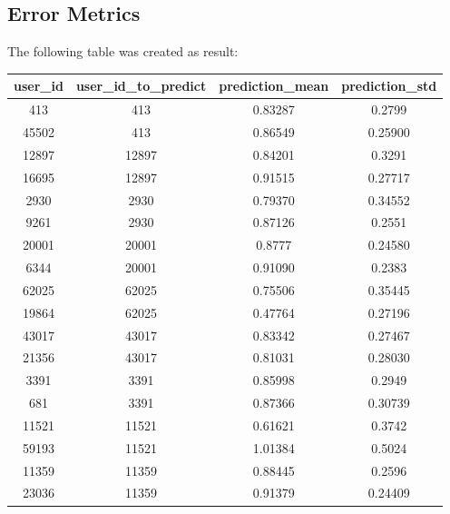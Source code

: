 \documentclass[ecp,tc,english]{iiufrgs}
\begin{document}
        \subsection{Error Metrics}
        The following table was created as result:
        \begin{table}[!ht]
            \centering
            \begin{tabular}{ |c|c|c|c| } 
                \hline
                user\_id & user\_id\_to\_predict & prediction\_mean & prediction\_std \\
                \hline 
                413 & 413 & 0.83287 & 0.2799 \\
                45502 & 413 & 0.86549 & 0.25900 \\
                \rowcolor[RGB]{220,220,220}
                12897 & 12897 & 0.84201 & 0.3291 \\
                \rowcolor[RGB]{220,220,220}        
                16695 & 12897 & 0.91515 & 0.27717 \\
                2930 & 2930 & 0.79370 & 0.34552 \\
                9261 & 2930 & 0.87126 & 0.2551 \\
                \rowcolor[RGB]{220,220,220}        
                20001 & 20001 & 0.8777 & 0.24580 \\
                \rowcolor[RGB]{220,220,220}        
                6344 & 20001 & 0.91090 & 0.2383 \\
                62025 & 62025 & 0.75506 & 0.35445 \\
                19864 & 62025 & 0.47764 & 0.27196 \\
                \rowcolor[RGB]{220,220,220}        
                43017 & 43017 & 0.83342 & 0.27467 \\
                \rowcolor[RGB]{220,220,220}        
                21356 & 43017 & 0.81031 & 0.28030 \\
                3391 & 3391 & 0.85998 & 0.2949 \\
                681 & 3391 & 0.87366 & 0.30739 \\
                \rowcolor[RGB]{220,220,220}        
                11521 & 11521 & 0.61621 & 0.3742 \\
                \rowcolor[RGB]{220,220,220}                
                59193 & 11521 & 1.01384 & 0.5024 \\
                11359 & 11359 & 0.88445 & 0.2596 \\
                23036 & 11359 & 0.91379 & 0.24409 \\

\end{tabular}
\end{table}
\end{document}
